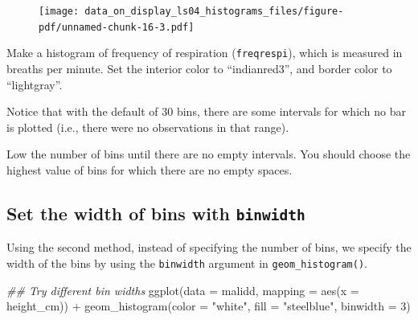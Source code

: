 \documentclass[
  letterpaper,
  DIV=11,
  numbers=noendperiod]{scrreprt}
\newenvironment{Shaded}{\begin{snugshade}}{\end{snugshade}}
\newcommand{\AttributeTok}[1]{\textcolor[rgb]{0.40,0.45,0.13}{#1}}
\newcommand{\DecValTok}[1]{\textcolor[rgb]{0.68,0.00,0.00}{#1}}
\newcommand{\DocumentationTok}[1]{\textcolor[rgb]{0.37,0.37,0.37}{\textit{#1}}}
\newcommand{\FunctionTok}[1]{\textcolor[rgb]{0.28,0.35,0.67}{#1}}
\newcommand{\NormalTok}[1]{\textcolor[rgb]{0.00,0.23,0.31}{#1}}
\newcommand{\SpecialCharTok}[1]{\textcolor[rgb]{0.37,0.37,0.37}{#1}}
\newcommand{\StringTok}[1]{\textcolor[rgb]{0.13,0.47,0.30}{#1}}
\begin{document}
\begin{figure}[H]

{\centering \texttt{[image: data\_on\_display\_ls04\_histograms\_files/figure-pdf/unnamed-chunk-16-3.pdf]}

}

\end{figure}

\begin{tcolorbox}[enhanced jigsaw, colframe=quarto-callout-tip-color-frame, colbacktitle=quarto-callout-tip-color!10!white, titlerule=0mm, opacitybacktitle=0.6, breakable, toprule=.15mm, arc=.35mm, rightrule=.15mm, colback=white, bottomrule=.15mm, opacityback=0, toptitle=1mm, left=2mm, bottomtitle=1mm, title=\textcolor{quarto-callout-tip-color}{\faLightbulb}\hspace{0.5em}{Practice}, leftrule=.75mm, coltitle=black]

Make a histogram of frequency of respiration (\texttt{freqrespi}), which
is measured in breaths per minute. Set the interior color to
``indianred3'', and border color to ``lightgray''.

Notice that with the default of 30 bins, there are some intervals for
which no bar is plotted (i.e., there were no observations in that
range).

Low the number of bins until there are no empty intervals. You should
choose the highest value of bins for which there are no empty spaces.

\end{tcolorbox}

\hypertarget{set-the-width-of-bins-with-binwidth}{%
\subsection{\texorpdfstring{Set the width of bins with
\texttt{binwidth}}{Set the width of bins with binwidth}}\label{set-the-width-of-bins-with-binwidth}}

Using the second method, instead of specifying the number of bins, we
specify the width of the bins by using the \texttt{binwidth} argument in
\texttt{geom\_histogram()}.

\begin{Shaded}
\begin{Highlighting}[]
\DocumentationTok{\#\# Try different bin widths}
\FunctionTok{ggplot}\NormalTok{(}\AttributeTok{data =}\NormalTok{  malidd, }
       \AttributeTok{mapping =} \FunctionTok{aes}\NormalTok{(}\AttributeTok{x =}\NormalTok{ height\_cm)) }\SpecialCharTok{+}
  \FunctionTok{geom\_histogram}\NormalTok{(}\AttributeTok{color =} \StringTok{"white"}\NormalTok{, }
                 \AttributeTok{fill =} \StringTok{"steelblue"}\NormalTok{,}
                 \AttributeTok{binwidth =} \DecValTok{3}\NormalTok{)}
\end{Highlighting}
\end{Shaded}
\end{document}
